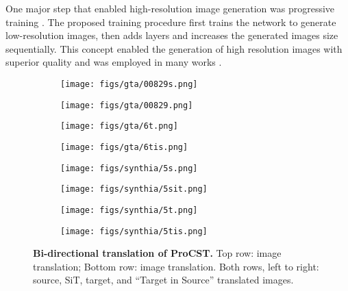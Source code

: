\documentclass[letterpaper]{article} \usepackage[]{aaai23}  \usepackage{times}  \usepackage{helvet}  \usepackage{courier}  \usepackage[hyphens]{url}  \usepackage{graphicx} \urlstyle{rm} \def\UrlFont{\rm}  \usepackage{natbib}  \usepackage{caption} \frenchspacing  \setlength{\pdfpagewidth}{8.5in} \setlength{\pdfpageheight}{11in} \usepackage{algorithm}
\begin{document}
One major step that enabled high-resolution image generation was progressive training \citet{karras2017progressive}. The proposed training procedure first trains the network to generate low-resolution images, then adds layers and increases the generated images size sequentially. This concept enabled the generation of high resolution images with superior quality and was employed in many works \cite{karras2017progressive, karras2019style, karras2020training, karras2021alias, wang2018high, shaham2019singan}.

\begin{figure*}[t]
    \centering
    \begin{subfigure}{0.24\linewidth}
        \centering
        \texttt{[image: figs/gta/00829s.png]}
    \end{subfigure}
    \begin{subfigure}{0.24\linewidth}
        \centering
        \texttt{[image: figs/gta/00829.png]}
    \end{subfigure}
    \begin{subfigure}{0.24\linewidth}
        \centering
        \texttt{[image: figs/gta/6t.png]}
    \end{subfigure}
    \begin{subfigure}{0.24\linewidth}
        \centering
        \texttt{[image: figs/gta/6tis.png]}
    \end{subfigure}
    
    \centering
    \begin{subfigure}{0.24\linewidth}
        \centering
        \texttt{[image: figs/synthia/5s.png]}
    \end{subfigure}
    \begin{subfigure}{0.24\linewidth}
        \centering
        \texttt{[image: figs/synthia/5sit.png]}
    \end{subfigure}
    \begin{subfigure}{0.24\linewidth}
        \centering
        \texttt{[image: figs/synthia/5t.png]}
    \end{subfigure}
    \begin{subfigure}{0.24\linewidth}
        \centering
        \texttt{[image: figs/synthia/5tis.png]}
    \end{subfigure}
    
 
    \caption{{\bf Bi-directional translation of ProCST.} Top row:  image translation; Bottom row:  image translation. Both rows, left to right: source, SiT, target, and ``Target in Source'' translated images.}
    \label{fig:sit_tis_translations}
\end{figure*}
\end{document}
